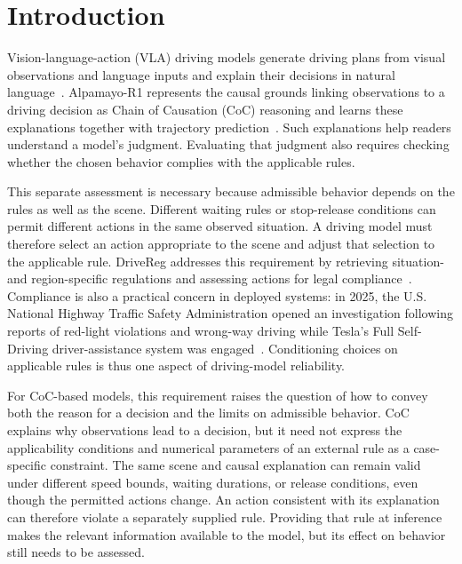 \section{Introduction}\label{sec:introduction}

Vision-language-action (VLA) driving models generate driving plans from visual observations and language inputs and explain their decisions in natural language~\cite{r1,r2,r3}. Alpamayo-R1 represents the causal grounds linking observations to a driving decision as Chain of Causation (CoC) reasoning and learns these explanations together with trajectory prediction~\cite{r1}. Such explanations help readers understand a model's judgment. Evaluating that judgment also requires checking whether the chosen behavior complies with the applicable rules.\par

This separate assessment is necessary because admissible behavior depends on the rules as well as the scene. Different waiting rules or stop-release conditions can permit different actions in the same observed situation. A driving model must therefore select an action appropriate to the scene and adjust that selection to the applicable rule. DriveReg addresses this requirement by retrieving situation- and region-specific regulations and assessing actions for legal compliance~\cite{r7}. Compliance is also a practical concern in deployed systems: in 2025, the U.S. National Highway Traffic Safety Administration opened an investigation following reports of red-light violations and wrong-way driving while Tesla's Full Self-Driving driver-assistance system was engaged~\cite{NHTSA2025PE25012}. Conditioning choices on applicable rules is thus one aspect of driving-model reliability.\par

For CoC-based models, this requirement raises the question of how to convey both the reason for a decision and the limits on admissible behavior. CoC explains why observations lead to a decision, but it need not express the applicability conditions and numerical parameters of an external rule as a case-specific constraint. The same scene and causal explanation can remain valid under different speed bounds, waiting durations, or release conditions, even though the permitted actions change. An action consistent with its explanation can therefore violate a separately supplied rule. Providing that rule at inference makes the relevant information available to the model, but its effect on behavior still needs to be assessed.\par

